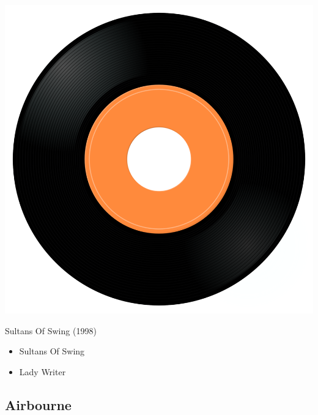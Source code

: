 \begin{minipage}[t]{0.25\textwidth}
\captionsetup{type=figure}
\includegraphics[width=\textwidth]{Images/cover.png}
\caption*{Sultans Of Swing (1998)}
\end{minipage}
\begin{minipage}[t]{0.25\textwidth}\vspace{0pt}
\begin{itemize}[nosep,leftmargin=1em,labelwidth=*,align=left]
	\setlength{\itemsep}{0pt}
	\item Sultans Of Swing
	\item Lady Writer
\end{itemize}
\end{minipage}

\subsection{Airbourne}

